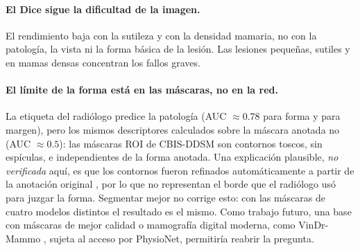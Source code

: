 \documentclass[11pt,a4paper]{article}
\begin{document}
\paragraph{El Dice sigue la dificultad de la imagen.} El rendimiento baja con la sutileza y con la densidad mamaria, no con la patología, la vista ni la forma básica de la lesión. Las lesiones pequeñas, sutiles y en mamas densas concentran los fallos graves.

\paragraph{El límite de la forma está en las máscaras, no en la red.} La etiqueta del radiólogo predice la patología (AUC $\approx0.78$ para forma y para margen), pero los mismos descriptores calculados sobre la máscara anotada no (AUC $\approx 0.5$): las máscaras ROI de CBIS-DDSM son contornos toscos, sin espículas, e independientes de la forma anotada. Una explicación plausible, \emph{no verificada} aquí, es que los contornos fueron refinados automáticamente a partir de la anotación original \citep{lee2017cbisddsm}, por lo que no representan el borde que el radiólogo usó para juzgar la forma. Segmentar mejor no corrige esto: con las máscaras de cuatro modelos distintos el resultado es el mismo. Como trabajo futuro, una base con máscaras de mejor calidad o mamografía digital moderna, como VinDr-Mammo \citep{nguyen2023vindr}, sujeta al acceso por PhysioNet, permitiría reabrir la pregunta.

\end{document}
